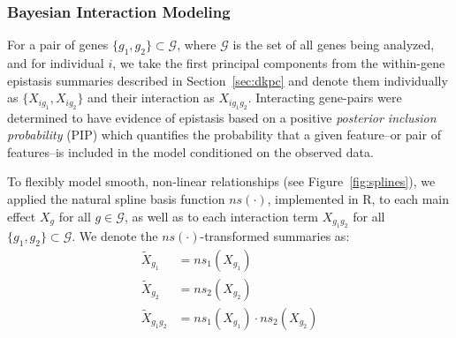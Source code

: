 \documentclass{article}\usepackage[]{graphicx}\usepackage[]{color}
\begin{document}
\subsubsection{Bayesian Interaction Modeling}
\label{sec:bim}
For a pair of genes $\{g_1, g_2\} \subset \mathcal{G}$, where $\mathcal{G}$ is the set of all genes being analyzed, and for individual $i$, we take the first principal components from the within-gene epistasis summaries described in Section~\ref{sec:dkpc} and denote them individually as $\{X_{ig_1}, X_{ig_2}\}$ and their interaction as $X_{ig_1g_2}$. Interacting gene-pairs were determined to have evidence of epistasis based on a positive \textit{posterior inclusion probability} (PIP) which quantifies the probability that a given feature--or pair of features--is included in the model conditioned on the observed data. 
\par
To flexibly model smooth, non-linear relationships (see Figure~\ref{fig:splines}), we applied the natural spline basis function $ns(\cdot)$, implemented in R\cite{rcoreteamLanguageEnvironmentStatistical2023}, to each main effect $X_{g}$ for all $g \in \mathcal{G}$, as well as to each interaction term $X_{g_1g_2}$ for all $\{g_1, g_2\} \subset \mathcal{G}$. We denote the $ns(\cdot)$-transformed summaries as:
\begin{align}
\tilde{X}_{g_1} &= ns_1(X_{g_1}) \\
\tilde{X}_{g_2} &= ns_2(X_{g_2}) \\
\tilde{X}_{g_1g_2} &= ns_1(X_{g_1}) \cdot ns_2(X_{g_2})
\end{align}
\end{document}
